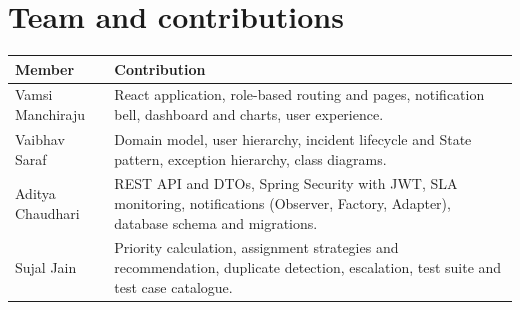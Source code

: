 \documentclass[11pt,a4paper]{article}
\begin{document}
\section{Team and contributions}
\begin{tabularx}{\linewidth}{@{}l X@{}}
\toprule
\textbf{Member} & \textbf{Contribution} \\ \midrule
Vamsi Manchiraju & React application, role-based routing and pages, notification bell, dashboard and charts, user experience. \\
Vaibhav Saraf & Domain model, user hierarchy, incident lifecycle and State pattern, exception hierarchy, class diagrams. \\
Aditya Chaudhari & REST API and DTOs, Spring Security with JWT, SLA monitoring, notifications (Observer, Factory, Adapter), database schema and migrations. \\
Sujal Jain & Priority calculation, assignment strategies and recommendation, duplicate detection, escalation, test suite and test case catalogue. \\ \bottomrule
\end{tabularx}

\appendix
\end{document}
